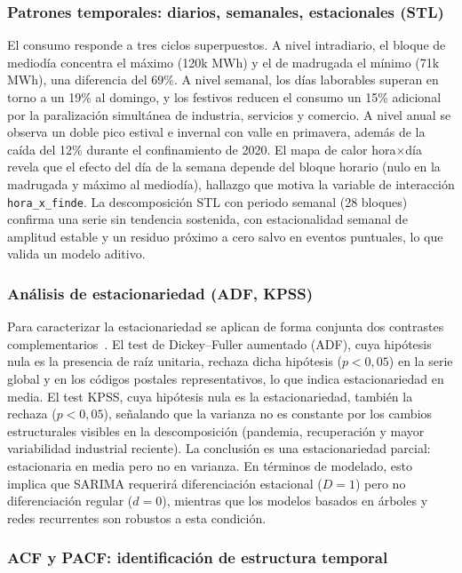 \documentclass[12pt, a4paper]{article}
\begin{document}
\subsubsection{Patrones temporales: diarios, semanales, estacionales (STL)}


El consumo responde a tres ciclos superpuestos. A nivel intradiario, el bloque de mediodía concentra el máximo (120k MWh) y el de madrugada el mínimo (71k MWh), una diferencia del 69\%. A nivel semanal, los días laborables superan en torno a un 19\% al domingo, y los festivos reducen el consumo un 15\% adicional por la paralización simultánea de industria, servicios y comercio. A nivel anual se observa un doble pico estival e invernal con valle en primavera, además de la caída del 12\% durante el confinamiento de 2020. El mapa de calor hora$\times$día revela que el efecto del día de la semana depende del bloque horario (nulo en la madrugada y máximo al mediodía), hallazgo que motiva la variable de interacción \texttt{hora\_x\_finde}. La descomposición STL con periodo semanal (28 bloques) confirma una serie sin tendencia sostenida, con estacionalidad semanal de amplitud estable y un residuo próximo a cero salvo en eventos puntuales, lo que valida un modelo aditivo.

\subsubsection{Análisis de estacionariedad (ADF, KPSS)}


Para caracterizar la estacionariedad se aplican de forma conjunta dos contrastes complementarios~\cite{hyndman2021}. El test de Dickey--Fuller aumentado (ADF), cuya hipótesis nula es la presencia de raíz unitaria, rechaza dicha hipótesis ($p<0,05$) en la serie global y en los códigos postales representativos, lo que indica estacionariedad en media. El test KPSS, cuya hipótesis nula es la estacionariedad, también la rechaza ($p<0,05$), señalando que la varianza no es constante por los cambios estructurales visibles en la descomposición (pandemia, recuperación y mayor variabilidad industrial reciente). La conclusión es una estacionariedad parcial: estacionaria en media pero no en varianza. En términos de modelado, esto implica que SARIMA requerirá diferenciación estacional ($D=1$) pero no diferenciación regular ($d=0$), mientras que los modelos basados en árboles y redes recurrentes son robustos a esta condición.

\subsubsection{ACF y PACF: identificación de estructura temporal}
\end{document}
